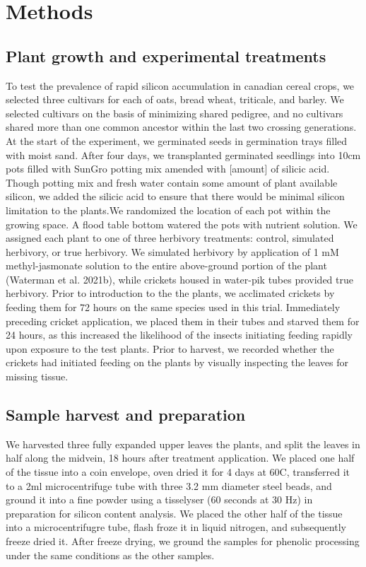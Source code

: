 \documentclass[12pt, letterpaper, ]{report}
\begin{document}
\section{Methods}

\subsection{Plant growth and experimental treatments}

To test the prevalence of rapid silicon accumulation in canadian cereal crops, we selected three cultivars for each of oats, bread wheat, triticale, and barley. We selected cultivars on the basis of minimizing shared pedigree, and no cultivars shared more than one common ancestor within the last two crossing generations. At the start of the experiment, we germinated seeds in germination trays filled with moist sand. After four days, we transplanted germinated seedlings into 10cm pots filled with SunGro potting mix amended with [amount] of silicic acid. Though potting mix and fresh water contain some amount of plant available silicon, we added the silicic acid to ensure that there would be minimal silicon limitation to the plants.We randomized the location of each pot within the growing space. A flood table bottom watered the pots with nutrient solution. We assigned each plant to one of three herbivory treatments: control, simulated herbivory, or true herbivory. We simulated herbivory by application of 1 mM methyl-jasmonate solution to the entire above-ground portion of the plant (Waterman et al. 2021b), while crickets housed in water-pik tubes provided true herbivory. Prior to introduction to the the plants, we acclimated crickets by feeding them for 72 hours on the same species used in this trial. Immediately preceding cricket application, we placed them in their tubes and starved them for 24 hours, as this increased the likelihood of the insects initiating feeding rapidly upon exposure to the test plants. Prior to harvest, we recorded whether the crickets had initiated feeding on the plants by visually inspecting the leaves for missing tissue. 

\subsection{Sample harvest and preparation}

We harvested three fully expanded upper leaves the plants, and split the leaves in half along the midvein, 18 hours after treatment application. We placed one half of the tissue into a coin envelope, oven dried it for 4 days at 60\degree C, transferred it to a 2ml microcentrifuge tube with three 3.2 mm diameter steel beads, and ground it into a fine powder using a tisselyser (60 seconds at 30 Hz) in preparation for silicon content analysis. We placed the other half of the tissue into a microcentrifugre tube, flash froze it in liquid nitrogen, and subsequently freeze dried it. After freeze drying, we ground the samples for phenolic processing under the same conditions as the other samples.
\end{document}
